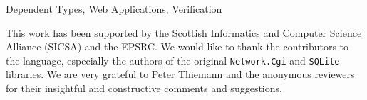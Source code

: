 \documentclass[]{sigplanconf}
\begin{document}


\keywords
Dependent Types, Web Applications, Verification











\acks
This work has been supported by the Scottish Informatics and Computer Science Alliance (SICSA) and the EPSRC. We would like to thank the contributors to the \idris{} language, especially the authors of the original \texttt{Network.Cgi} and \texttt{SQLite} libraries.
We are very grateful to Peter Thiemann and the anonymous reviewers for their insightful and constructive comments and suggestions.






%
%
\end{document}
